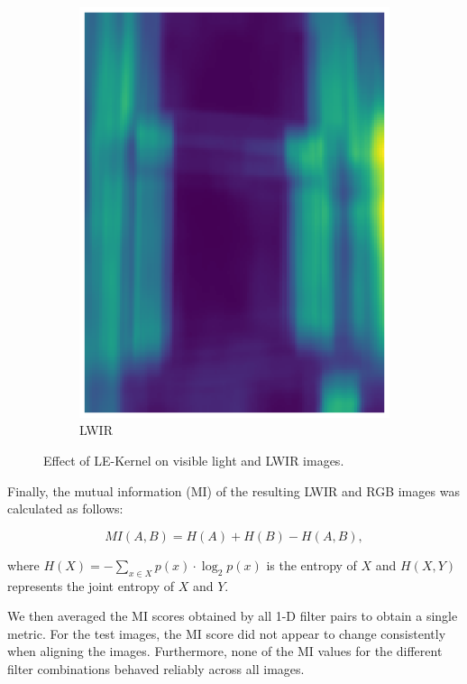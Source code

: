 \documentclass{l4proj}
\begin{document}
\begin{figure}[ht]
\begin{subfigure}[h!]{0.3\textwidth}
    \includegraphics[width=\textwidth]{images/registration/filtered_le_lwir.png}
    \caption{LWIR}
  \end{subfigure}
  \caption{Effect of LE-Kernel \citep{laws_rapid_1980} on visible light and LWIR images.}
  \label{fig:le_filter}
\end{figure}

Finally, the mutual information (MI) of the resulting LWIR and RGB images was calculated as follows:

\begin{equation}
  MI(A,B) = H(A) + H(B) - H(A,B),
\end{equation}

where $H(X) = - \sum_{x \in X} p(x) \cdot \log_2 p(x)$ is the entropy of $X$ and $H(X,Y)$ represents the joint entropy of $X$ and $Y$.

We then averaged the MI scores obtained by all 1-D filter pairs to obtain a single metric. For the test images, the MI score did not appear to change consistently when aligning the images. Furthermore, none of the MI values for the different filter combinations behaved reliably across all images. 
\end{document}
